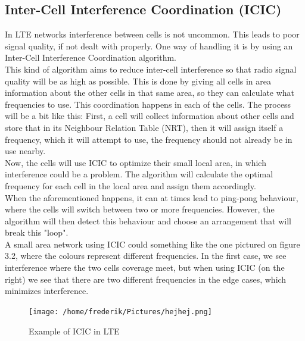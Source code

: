 \documentclass{report}
\begin{document}
\subsection{Inter-Cell Interference Coordination (ICIC)}
In LTE networks interference between cells is not uncommon. This leads to poor signal quality, if not dealt with properly. One way of handling it is by using an Inter-Cell Interference Coordination algorithm. \\ This kind of algorithm aims to reduce inter-cell interference so that  radio signal quality will be as high as possible. This is done by giving all cells in area information about the other cells in that same area, so they can calculate what frequencies to use. This coordination happens in each of the cells. The process will be a bit like this: 
First, a cell will collect information about other cells and store that in its Neighbour Relation Table (NRT), then it will assign itself a frequency, which it will attempt to use, the frequency should not already be in use nearby. \\ Now, the cells will use ICIC to optimize their small local area, in which interference could be a problem. The algorithm will calculate the optimal frequency for each cell in the local area and assign them accordingly. \\ When the aforementioned happens, it can at times lead to ping-pong behaviour, where the cells will switch between two or more frequencies. However, the algorithm will then detect this behaviour and choose an arrangement that will break this "loop". \cite{Karla2010} \\ A small area network using ICIC could something like the one pictured on figure 3.2, where the colours represent different frequencies. In the first case, we see interference where the two cells coverage meet, but when using ICIC (on the right) we see that there are two different frequencies in the edge cases, which minimizes interference.

\begin{figure}[!ht]
	\centering
	\texttt{[image: /home/frederik/Pictures/hejhej.png]}
	\caption{Example of ICIC in LTE \cite{Henrik}}
\end{figure}
\end{document}
